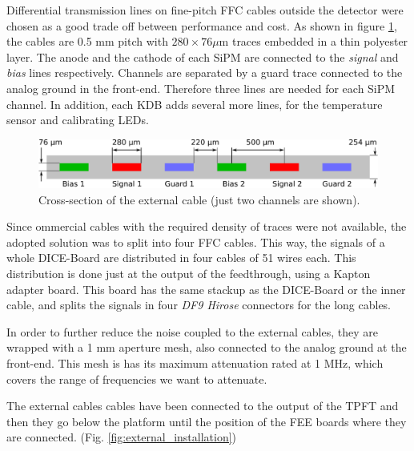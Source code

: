 Differential transmission lines on fine-pitch FFC cables outside the detector were chosen as a good trade off between performance and cost. As shown in figure \ref{fig:external}, the cables are 0.5 mm pitch with $280 \times 76 \mu$m traces embedded in a thin polyester layer. The anode and the cathode of each SiPM are connected to the \textit{signal} and \textit{bias} lines respectively. Channels are separated by a guard trace connected to the analog ground in the front-end. Therefore three lines are needed for each SiPM channel. In addition, each KDB adds several more lines, for the  temperature sensor and  calibrating LEDs.

\begin{figure}[h!]
\centering
\includegraphics[width=.6\textwidth]{IMG/section.pdf}
\caption{Cross-section of the external cable (just two channels are shown).}
\label{fig:external}
\end{figure}

Since ommercial cables with the required density of traces were not available, the adopted solution was to split into four FFC cables. This way, the signals of a whole DICE-Board are distributed in four cables of 51 wires each. This distribution is done just at the output of the feedthrough, using a Kapton adapter board. This board has the same stackup as the DICE-Board or the inner cable, and splits the signals in four \textit{DF9 Hirose} connectors for the long cables.

In order to further reduce the noise coupled to the external cables, they are wrapped with a 1 mm aperture mesh, also connected to the analog ground at the front-end. This mesh is has its maximum attenuation rated at 1 MHz, which covers the range of frequencies we want to attenuate.

The external cables cables have been connected to the output of the TPFT and then they go below the platform until the position of the FEE boards where they are connected. (Fig. \ref{fig:external_installation})


